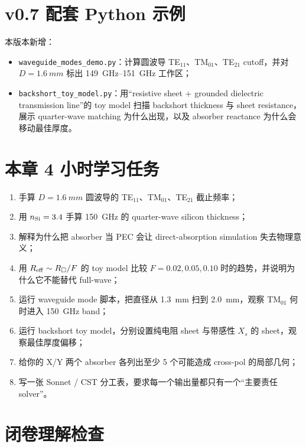 \documentclass[11pt,a4paper,openany]{ctexrep}
\begin{document}
\section{v0.7 配套 Python 示例}

本版本新增：
\begin{itemize}
  \item \texttt{waveguide\_modes\_demo.py}：计算圆波导 TE$_{11}$、TM$_{01}$、TE$_{21}$ cutoff，并对 $D=\SI{1.6}{mm}$ 标出 \SIrange{149}{151}{GHz} 工作区；
  \item \texttt{backshort\_toy\_model.py}：用“resistive sheet + grounded dielectric transmission line”的 toy model 扫描 backshort thickness 与 sheet resistance，展示 quarter-wave matching 为什么出现，以及 absorber reactance 为什么会移动最佳厚度。
\end{itemize}

\section{本章 4 小时学习任务}

\begin{enumerate}
  \item 手算 $D=\SI{1.6}{mm}$ 圆波导的 TE$_{11}$、TM$_{01}$、TE$_{21}$ 截止频率；
  \item 用 $n_{\rm Si}=3.4$ 手算 \SI{150}{GHz} 的 quarter-wave silicon thickness；
  \item 解释为什么把 absorber 当 PEC 会让 direct-absorption simulation 失去物理意义；
  \item 用 $R_{\rm eff}\sim R_\square/F$ 的 toy model 比较 $F=0.02,0.05,0.10$ 时的趋势，并说明为什么它不能替代 full-wave；
  \item 运行 waveguide mode 脚本，把直径从 \SI{1.3}{mm} 扫到 \SI{2.0}{mm}，观察 TM$_{01}$ 何时进入 \SI{150}{GHz} band；
  \item 运行 backshort toy model，分别设置纯电阻 sheet 与带感性 $X_s$ 的 sheet，观察最佳厚度偏移；
  \item 给你的 X/Y 两个 absorber 各列出至少 5 个可能造成 cross-pol 的局部几何；
  \item 写一张 Sonnet / CST 分工表，要求每一个输出量都只有一个“主要责任 solver”。
\end{enumerate}

\section{闭卷理解检查}
\end{document}
